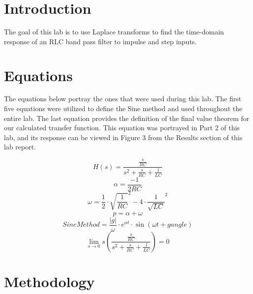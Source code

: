 \documentclass[12pt]{report}
\begin{document}
\section{Introduction}
 

The goal of this lab is to use Laplace transforms to find the time-domain response of an RLC band pass filter to impulse and step inputs.

\section{Equations}

The equations below portray the ones that were used during this lab. The first five equations were utilized to define the Sine method and used throughout the entire lab. The last equation provides the definition of the final value theorem for our calculated transfer function. This equation was portrayed in Part 2 of this lab, and its response can be viewed in Figure 3 from the Results section of this lab report.

\begin{equation}
    H(s) = \frac{\frac{s}{RC}}{s^{2}+\frac{s}{RC}+\frac{1}{LC}}
\end{equation}
\begin{equation}
    \alpha = \frac{-1}{2RC}
\end{equation}
\begin{equation}
   \omega = \frac{1}{2}\cdot {\sqrt{\frac{1}{RC}}^{2}}-4\cdot {\frac{1}{\sqrt{LC}}}^{2}
\end{equation}
\begin{equation}
   p = \alpha + \omega
\end{equation}
\begin{equation}
   Sine Method = \frac{|g|}{\omega}\cdot e^{\alpha t} \cdot \sin({\omega t + gangle})
\end{equation}
\begin{equation}
    \lim_{s\to 0} s(\frac{\frac{s}{RC}}{s^{2}+\frac{s}{RC}+\frac{1}{LC}}) = 0
\end{equation}


\section{Methodology}
\end{document}
